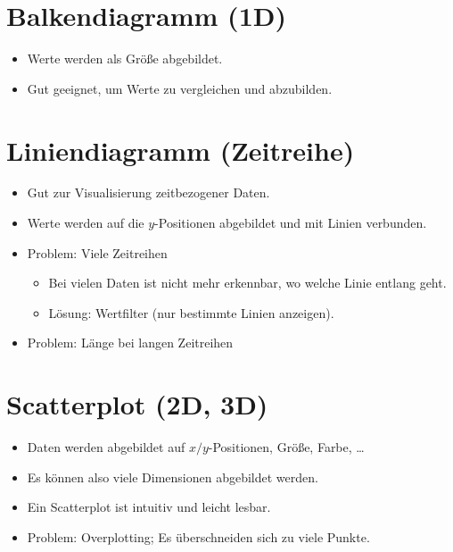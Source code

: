 		\section{Balkendiagramm (1D)}
			\begin{itemize}
				\item Werte werden als Größe abgebildet.
				\item Gut geeignet, um Werte zu vergleichen und abzubilden.
			\end{itemize}

		\section{Liniendiagramm (Zeitreihe)}
			\begin{itemize}
				\item Gut zur Visualisierung zeitbezogener Daten.
				\item Werte werden auf die \(y\)-Positionen abgebildet und mit Linien verbunden.
				\item Problem: Viele Zeitreihen
					\begin{itemize}
						\item Bei vielen Daten ist nicht mehr erkennbar, wo welche Linie entlang geht.
						\item Lösung: Wertfilter (nur bestimmte Linien anzeigen).
					\end{itemize}
				\item Problem: Länge bei langen Zeitreihen
			\end{itemize}

		\section{Scatterplot (2D, 3D)}
			\begin{itemize}
				\item Daten werden abgebildet auf \(x/y\)-Positionen, Größe, Farbe, \dots
				\item Es können also viele Dimensionen abgebildet werden.
				\item Ein Scatterplot ist intuitiv und leicht lesbar.
				\item Problem: Overplotting; Es überschneiden sich zu viele Punkte.
			\end{itemize}


